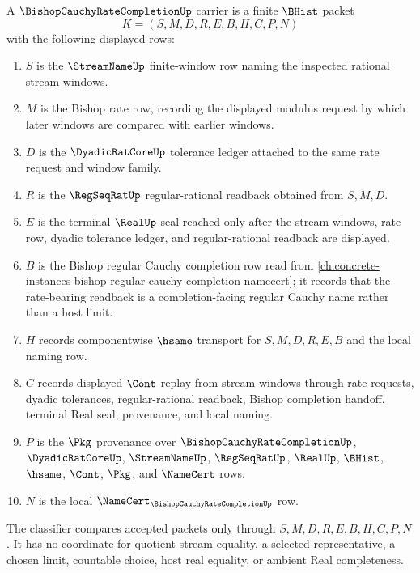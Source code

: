 \begin{definition}
\label{def:bishop-cauchy-rate-completion-carrier}
A $\BishopCauchyRateCompletionUp$ carrier is a finite $\BHist$ packet
$$
K=(S,M,D,R,E,B,H,C,P,N)
$$
with the following displayed rows:
\begin{enumerate}
\item $S$ is the $\StreamNameUp$ finite-window row naming the inspected rational stream windows.
\item $M$ is the Bishop rate row, recording the displayed modulus request by which later windows are compared with earlier windows.
\item $D$ is the $\DyadicRatCoreUp$ tolerance ledger attached to the same rate request and window family.
\item $R$ is the $\RegSeqRatUp$ regular-rational readback obtained from $S,M,D$.
\item $E$ is the terminal $\RealUp$ seal reached only after the stream windows, rate row, dyadic tolerance ledger, and regular-rational readback are displayed.
\item $B$ is the Bishop regular Cauchy completion row read from \autoref{ch:concrete-instances-bishop-regular-cauchy-completion-namecert}; it records that the rate-bearing readback is a completion-facing regular Cauchy name rather than a host limit.
\item $H$ records componentwise $\hsame$ transport for $S,M,D,R,E,B$ and the local naming row.
\item $C$ records displayed $\Cont$ replay from stream windows through rate requests, dyadic tolerances, regular-rational readback, Bishop completion handoff, terminal Real seal, provenance, and local naming.
\item $P$ is the $\Pkg$ provenance over $\BishopCauchyRateCompletionUp$, $\DyadicRatCoreUp$, $\StreamNameUp$, $\RegSeqRatUp$, $\RealUp$, $\BHist$, $\hsame$, $\Cont$, $\Pkg$, and $\NameCert$ rows.
\item $N$ is the local $\NameCert_{\BishopCauchyRateCompletionUp}$ row.
\end{enumerate}
The classifier compares accepted packets only through $S,M,D,R,E,B,H,C,P,N$. It has no coordinate for quotient stream equality, a selected representative, a chosen limit, countable choice, host real equality, or ambient Real completeness.
\end{definition}

